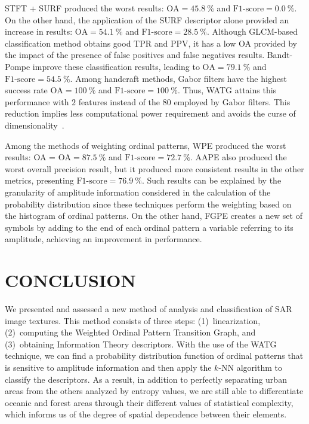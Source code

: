 \documentclass[journal]{IEEEtran}
\begin{document}
	STFT + SURF produced the worst results: $\text{OA}=\SI{45.8}{\percent}$ and $\text{F1-score}=\SI{0.0}{\percent}$.
    On the other hand, the application of the SURF descriptor alone provided an increase in results:  $\text{OA}=\SI{54.1}{\percent}$ and $\text{F1-score}=\SI{28.5}{\percent}$.
    Although GLCM-based classification method obtains good TPR and PPV, it has a low OA provided by the impact of the presence of false positives and false negatives results.
	Bandt-Pompe improve these classification results, leading to  $\text{OA}=\SI{79.1}{\percent}$ and $\text{F1-score}=\SI{54.5}{\percent}$.
	Among handcraft methods, Gabor filters have the highest success rate $\text{OA} = \SI{100}{\percent}$ and $\text{F1-score} = \SI{100}{\percent}$.
    Thus, WATG attains this performance with $2$ features instead of the $80$ employed by Gabor filters.
    This reduction implies less computational power requirement and avoids the curse of dimensionality~\cite{TheCursesofDimensionality2018}.
	
	Among the methods of weighting ordinal patterns, WPE produced the worst results: OA = $\text{OA}=\SI{87.5}{\percent}$ and $\text{F1-score}=\SI{72.7}{\percent}$.
	AAPE also produced the worst overall precision result, but it produced more consistent results in the other metrics, presenting $\text{F1-score} = \SI{76,9}{\percent}$.
	Such results can be explained by the granularity of amplitude information considered in the calculation of the probability distribution since these techniques perform the weighting based on the histogram of ordinal patterns.
	On the other hand, FGPE creates a new set of symbols by adding to the end of each ordinal pattern a variable referring to its amplitude, achieving an improvement in performance.
	
	\section{CONCLUSION}\label{Conclusion}
	
	We presented and assessed a new method of analysis and classification of SAR image textures.
	This method consists of three steps: 
	(1)~linearization, 
	(2)~computing the Weighted Ordinal Pattern Transition Graph, and 
	(3)~obtaining Information Theory descriptors.	
	With the use of the WATG technique, we can find a probability distribution function of ordinal patterns that is sensitive to amplitude information and then apply the $k$-NN algorithm to classify the descriptors.
	As a result, in addition to perfectly separating urban areas from the others analyzed by entropy values, we are still able to differentiate oceanic and forest areas through their different values of statistical complexity, which informs us of the degree of spatial dependence between their elements.
	
\end{document}
